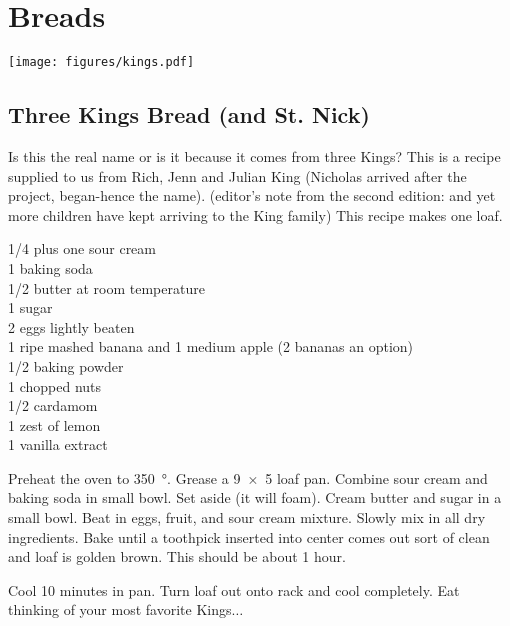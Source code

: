 \chapter{Breads}

\begin{center}
    \texttt{[image: figures/kings.pdf]}
\end{center}

\section{Three Kings Bread (and St. Nick)}

\begin{open}
  Is this the real name or is it because it comes from three Kings?
  This is a recipe supplied to us from Rich, Jenn and Julian King (Nicholas arrived after the project, began-hence the name). (editor's note from the second edition: and yet more children have kept arriving to the King family)
  This recipe makes one loaf.
\end{open}
\begin{ingredients}
  \SI{1/4}{\cup} plus one \si{\tblspoon} sour cream \\
  \SI{1}{\teaspoon} baking soda \\
  \SI{1/2}{\cup} butter at room temperature \\
  \SI{1}{\cup} sugar \\
  2 eggs lightly beaten \\
  1 ripe mashed banana and 1 medium apple (2 bananas an option) \\
  \SI{1/2}{\teaspoon} baking powder \\
  \SI{1}{\cup} chopped nuts \\
  \SI{1/2}{\teaspoon} cardamom \\
  1 zest of lemon \\
  \SI{1}{\teaspoon} vanilla extract
\end{ingredients}
Preheat the oven to \SI{350}{\degree}.  Grease a \SI{9x5}{\inch} loaf pan.
Combine sour cream and baking soda in small bowl.  Set aside (it will foam).
Cream butter and sugar in a small bowl.  Beat in eggs, fruit, and sour cream
mixture.  Slowly mix in all dry ingredients.  Bake until a toothpick inserted
into center comes out sort of clean and loaf is golden brown.  This should be
about 1 hour.

Cool 10 minutes in pan. Turn loaf out onto rack and cool completely.  Eat
thinking of your most favorite Kings$\ldots$

